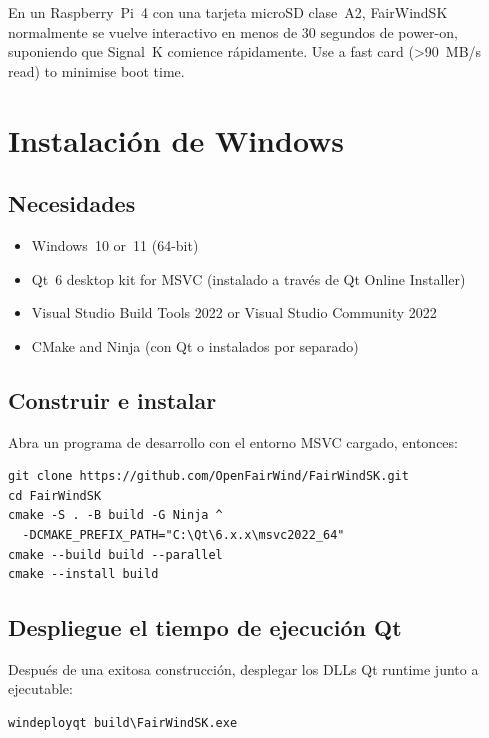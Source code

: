 \begin{tipbox}
En un Raspberry~Pi~4 con una tarjeta microSD clase~A2, FairWindSK
normalmente se vuelve interactivo en menos de 30 segundos de power-on,
suponiendo que Signal~K comience rápidamente.
Use a fast card (\textgreater{}90~MB/s read) to minimise boot time.
\end{tipbox}

\section{Instalación de Windows}
\label{app:windows}

\subsection{Necesidades}

\begin{itemize}
  \item Windows~10 or~11 (64-bit)
  \item Qt~6 desktop kit for MSVC
(instalado a través de Qt Online Installer)
  \item Visual Studio Build Tools 2022 or Visual Studio Community 2022
  \item CMake and Ninja
(con Qt o instalados por separado)
\end{itemize}

\subsection{Construir e instalar}

Abra un programa de desarrollo con el entorno MSVC cargado,
entonces:

\begin{lstlisting}
git clone https://github.com/OpenFairWind/FairWindSK.git
cd FairWindSK
cmake -S . -B build -G Ninja ^
  -DCMAKE_PREFIX_PATH="C:\Qt\6.x.x\msvc2022_64"
cmake --build build --parallel
cmake --install build
\end{lstlisting}

\subsection{Despliegue el tiempo de ejecución Qt}

Después de una exitosa construcción, desplegar los DLLs Qt runtime junto a
ejecutable:

\begin{lstlisting}
windeployqt build\FairWindSK.exe
\end{lstlisting}

